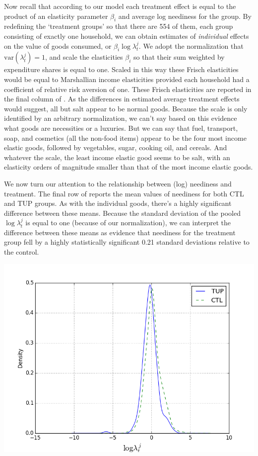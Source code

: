 \documentclass[11pt]{article}
\begin{document}
Now recall that according to our model each treatment effect is equal
to the product of an elasticity parameter $\beta_i$ and average log
neediness for the group.  By redefining the `treatment groups' so that
there are 554 of them, each group consisting of exactly one household,
we can obtain estimates of \emph{individual} effects on the value of goods
consumed, or $\beta_i\log\lambda^j_t$.  We adopt the normalization
that $\mbox{var}(\lambda^j_t)=1$, and scale the elasticities $\beta_i$
so that their sum weighted by expenditure shares is equal to one.
Scaled in this way these Frisch elasticities would be equal to
Marshallian income elasticities provided each household had a
coefficient of relative risk aversion of one.  These Frisch
elasticities are reported in the final column of .
As the differences in estimated average treatment effects would
suggest, all but salt appear to be normal goods.  Because the scale is
only identified by an arbitrary normalization, we can't say based on
this evidence what goods are necessities or a luxuries.  But we can
say that fuel, transport, soap, and cosmetics (all the non-food items)
appear to be the four most income elastic goods, followed by
vegetables, sugar, cooking oil, and cereals.  And whatever the scale,
the least income elastic good seems to be salt, with an elasticity
orders of magnitude smaller than that of the most income elastic goods.

We now turn our attention to the relationship between (log) neediness
and treatment.  The final row of  reports the mean
values of neediness for both CTL and TUP groups.  As with the
individual goods, there's a highly significant difference between
these means.  Because the standard deviation of the pooled
$\log\lambda^j_t$ is equal to one (because of our normalization), we
can interpret the difference between these means as evidence that
neediness for the treatment group fell by a highly statistically
significant 0.21 standard deviations relative to the control.

\includegraphics[width=.9\linewidth]{../analysis/figures/loglambda_distribution_by_treatment.png}
\end{document}
